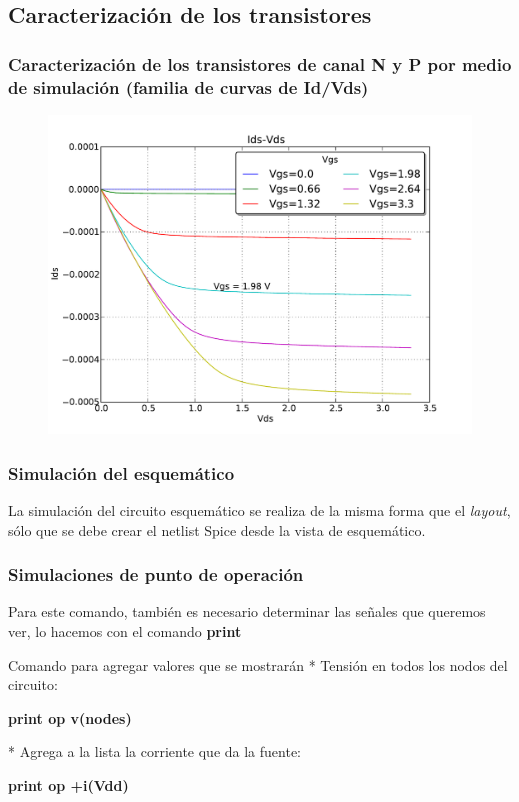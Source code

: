 \documentclass{beamer}
\begin{document}
\subsection{Caracterización de los transistores}
\begin{frame}
  \frametitle{Caracterización de los transistores de canal N y P por medio de simulación (familia de curvas de Id/Vds)}
  \begin{figure}
  \includegraphics[width=0.95\linewidth]{figuras/nmosMin-IDS-VDS.pdf}
  \end{figure}

\end{frame}
\begin{frame}
\frametitle{Simulación del esquemático}
  La simulación del circuito esquemático se realiza de la misma forma que el \emph{layout}, sólo que se debe crear el netlist Spice desde la vista de esquemático.

\end{frame}
\begin{frame}
\frametitle{Simulaciones de punto de operación}
Para este comando, también es necesario determinar las señales que queremos ver, lo hacemos con el comando \textbf{print}

  \begin{exampleblock}{Comando para agregar valores que se mostrarán}
    * Tensión en todos los nodos del circuito:

    \textbf{print \alert{op} v(nodes)}

    * Agrega a la lista la corriente que da la fuente:

  \textbf{print \alert{op} +i(Vdd)}  
\end{exampleblock}
\end{frame}
\end{document}
